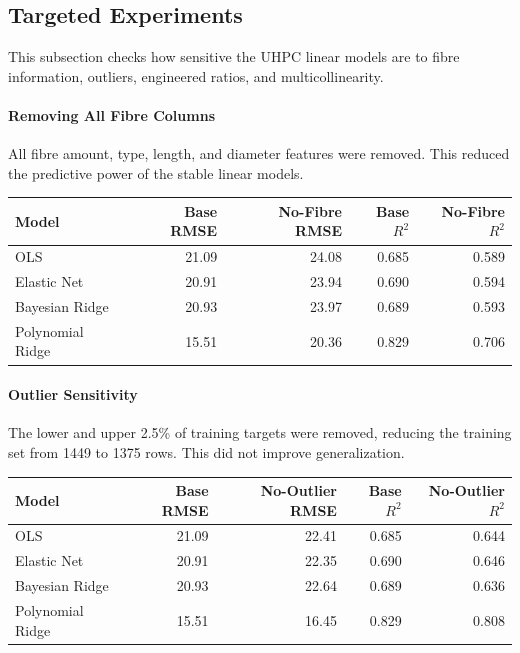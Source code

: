 \documentclass{article}
\begin{document}
\clearpage

\subsection{Targeted Experiments}
This subsection checks how sensitive the UHPC linear models are to fibre information, outliers, engineered ratios, and multicollinearity.

\paragraph{Removing All Fibre Columns}
All fibre amount, type, length, and diameter features were removed. This reduced the predictive power of the stable linear models.

\begin{center}
\small
\begin{tabular}{@{}lrrrr@{}}
\toprule
\textbf{Model} & \textbf{Base RMSE} & \textbf{No-Fibre RMSE} & \textbf{Base $R^2$} & \textbf{No-Fibre $R^2$} \\
\midrule
OLS              & 21.09 & 24.08 & 0.685 & 0.589 \\
Elastic Net      & 20.91 & 23.94 & 0.690 & 0.594 \\
Bayesian Ridge   & 20.93 & 23.97 & 0.689 & 0.593 \\
Polynomial Ridge & 15.51 & 20.36 & 0.829 & 0.706 \\
\bottomrule
\end{tabular}
\end{center}

\paragraph{Outlier Sensitivity}
The lower and upper 2.5\% of training targets were removed, reducing the training set from 1449 to 1375 rows. This did not improve generalization.

\begin{center}
\small
\begin{tabular}{@{}lrrrr@{}}
\toprule
\textbf{Model} & \textbf{Base RMSE} & \textbf{No-Outlier RMSE} & \textbf{Base $R^2$} & \textbf{No-Outlier $R^2$} \\
\midrule
OLS              & 21.09 & 22.41 & 0.685 & 0.644 \\
Elastic Net      & 20.91 & 22.35 & 0.690 & 0.646 \\
Bayesian Ridge   & 20.93 & 22.64 & 0.689 & 0.636 \\
Polynomial Ridge & 15.51 & 16.45 & 0.829 & 0.808 \\
\bottomrule
\end{tabular}
\end{center}
\end{document}
